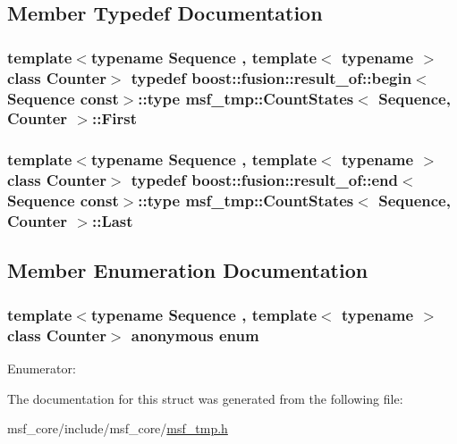 \subsection{Member Typedef Documentation}
\hypertarget{structmsf__tmp_1_1CountStates_acbf60b9f084215f06ff6be0777f28714}{
\subsubsection[{First}]{\setlength{\rightskip}{0pt plus 5cm}template$<$typename Sequence , template$<$ typename $>$ class Counter$>$ typedef boost\-::fusion\-::result\-\_\-of\-::begin$<$Sequence const$>$\-::type {\bf msf\-\_\-tmp\-::\-Count\-States}$<$ Sequence, Counter $>$\-::{\bf First}}}\label{structmsf__tmp_1_1CountStates_acbf60b9f084215f06ff6be0777f28714}
\hypertarget{structmsf__tmp_1_1CountStates_aacfada144f8987a32c5be3a01c9d99c0}{
\subsubsection[{Last}]{\setlength{\rightskip}{0pt plus 5cm}template$<$typename Sequence , template$<$ typename $>$ class Counter$>$ typedef boost\-::fusion\-::result\-\_\-of\-::end$<$Sequence const$>$\-::type {\bf msf\-\_\-tmp\-::\-Count\-States}$<$ Sequence, Counter $>$\-::{\bf Last}}}\label{structmsf__tmp_1_1CountStates_aacfada144f8987a32c5be3a01c9d99c0}


\subsection{Member Enumeration Documentation}
\hypertarget{structmsf__tmp_1_1CountStates_ae1fe3e11efda2e207cd42f8bf7c2eba2}{\subsubsection[{anonymous enum}]{\setlength{\rightskip}{0pt plus 5cm}template$<$typename Sequence , template$<$ typename $>$ class Counter$>$ anonymous enum}}\label{structmsf__tmp_1_1CountStates_ae1fe3e11efda2e207cd42f8bf7c2eba2}
\begin{Desc}
\item[Enumerator\-: ]\par
\begin{description}
\item[{\em 
\hypertarget{structmsf__tmp_1_1CountStates_ae1fe3e11efda2e207cd42f8bf7c2eba2a26821d1f33c34725492149ef021699c9}{value}\label{structmsf__tmp_1_1CountStates_ae1fe3e11efda2e207cd42f8bf7c2eba2a26821d1f33c34725492149ef021699c9}
}]\end{description}
\end{Desc}



The documentation for this struct was generated from the following file\-:\begin{DoxyCompactItemize}
\item 
msf\-\_\-core/include/msf\-\_\-core/\hyperlink{msf__tmp_8h}{msf\-\_\-tmp.\-h}\end{DoxyCompactItemize}

